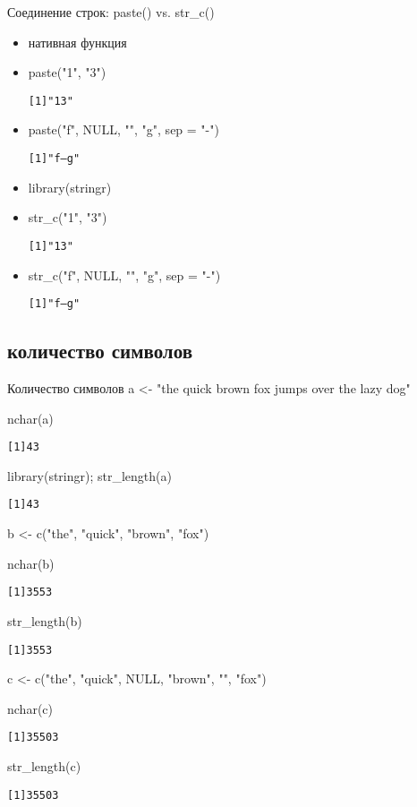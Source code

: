 \begin{frame}[fragile]{Соединение строк: paste() vs. str\_c()}
\begin{itemize}
\item[paste] нативная функция
\item[paste] paste("1"{}, "3")
\footnotesize
\begin{alltt}
[1] "1 3"
\end{alltt}
\normalsize
\item[paste] paste("f"{}, NULL, "{}"{}, "g"{}, sep = "{}-{}")
\footnotesize
\begin{alltt}
[1] "f---g"
\end{alltt}
\normalsize
\vfill
\item[str\_c] library(stringr)
\item[str\_c] str\_c("1"{}, "3")
\footnotesize
\begin{alltt}
[1] "13"
\end{alltt}
\normalsize
\item[str\_c] str\_c("f"{}, NULL, "{}"{}, "g"{}, sep = "{}-{}")
\footnotesize
\begin{alltt}
[1] "f--g"
\end{alltt}
\normalsize
\end{itemize}
\end{frame}
\subsection{количество символов}
\begin{frame}{Количество символов}
a <- "the quick brown fox jumps over the lazy dog"
\begin{itemize}
\mytem nchar(a)
\footnotesize
\begin{alltt}
[1] 43
\end{alltt}
\normalsize
\mytem library(stringr); str\_length(a)
\footnotesize
\begin{alltt}
[1] 43
\end{alltt}
\normalsize
\end{itemize}
\vfill
b  <-  c("the"{}, "quick"{}, "brown"{}, "fox")
\begin{itemize}
\mytem nchar(b)
\footnotesize
\begin{alltt}
[1] 3 5 5 3
\end{alltt}
\normalsize
\mytem str\_length(b)
\footnotesize
\begin{alltt}
[1] 3 5 5 3
\end{alltt}
\normalsize
\end{itemize}
\vfill
c <- c("the"{}, "quick"{}, NULL, "brown"{}, "{}"{}, "fox")
\begin{itemize}
\mytem nchar(c)
\footnotesize
\begin{alltt}
[1] 3 5 5 0 3
\end{alltt}
\normalsize
\mytem str\_length(c)
\footnotesize
\begin{alltt}
[1] 3 5 5 0 3
\end{alltt}
\normalsize
\end{itemize}
\end{frame}
